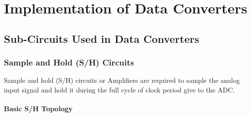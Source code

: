 \chapter{Implementation of Data Converters}
\label{chapter:results}
\section{Sub-Circuits Used in Data Converters}

\subsection{Sample and Hold (S/H) Circuits}
Sample and hold (S/H) circuits or Amplifiers are required to sample the analog input signal and hold it during the full cycle of clock period give to the ADC.
\subsubsection{Basic S/H Topology}
